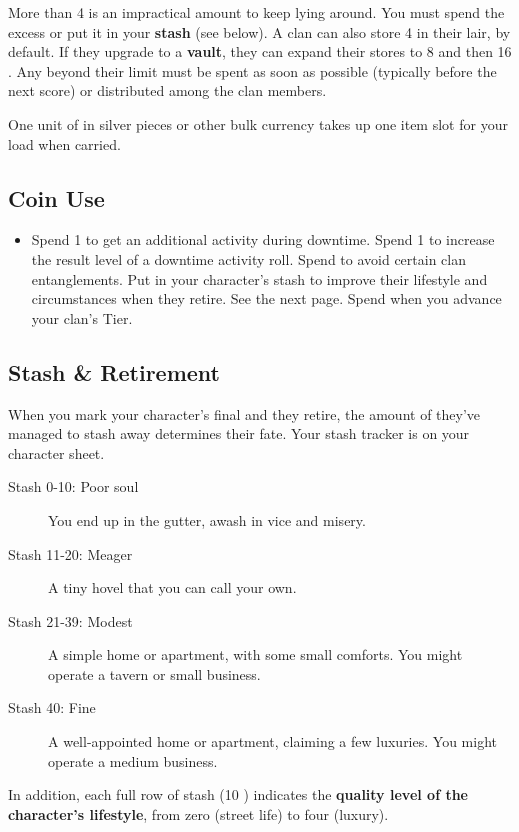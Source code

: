 More than 4  is an impractical amount to keep lying around. You must spend the excess or put it in your \textbf{stash} (see below). A clan can also store 4  in their lair, by default. If they upgrade to a \textbf{vault}, they can expand their stores to 8 and then 16 . Any  beyond their limit must be spent as soon as possible (typically before the next score) or distributed among the clan members.

One unit of  in silver pieces or other bulk currency takes up one item slot for your load when carried.

\subsection{Coin Use}
\begin{itemize}
\item Spend 1  to get an additional activity during downtime.
    Spend 1  to increase the result level of a downtime activity roll.
    Spend  to avoid certain clan entanglements.
    Put  in your character’s stash to improve their lifestyle and circumstances when they retire. See the next page.
    Spend  when you advance your clan’s Tier.
\end{itemize}
\subsection{Stash \& Retirement}

When you mark your character’s final  and they retire, the amount of  they’ve managed to stash away determines their fate. Your stash tracker is on your character sheet.
\begin{description}
\item[Stash 0-10: Poor soul] You end up in the gutter, awash in vice and misery.
\item[Stash 11-20: Meager] A tiny hovel that you can call your own.
\item[Stash 21-39: Modest] A simple home or apartment, with some small comforts. You might operate a tavern or small business.
\item[Stash 40: Fine] A well-appointed home or apartment, claiming a few luxuries. You might operate a medium business.
\end{description}

In addition, each full row of stash (10 ) indicates the \textbf{quality level of the character’s lifestyle}, from zero (street life) to four (luxury).


